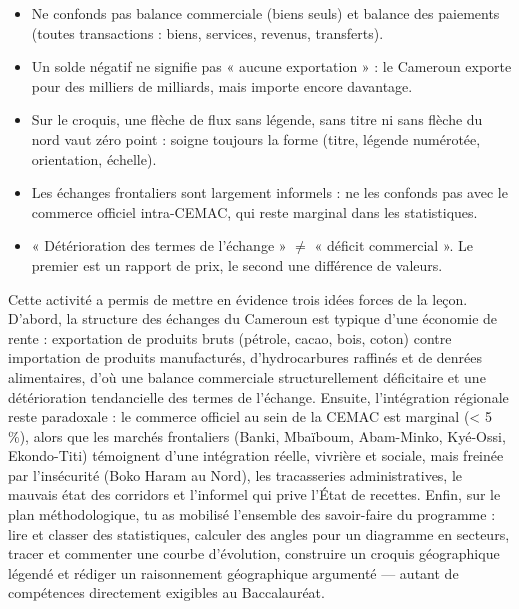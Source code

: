 \documentclass[11pt]{article}
\newcommand{\cle}[1]{{\popxbold\color{popdark}#1}}
\newcounter{popsec}
\newcounter{popsub}
\newcommand{\courssub}[1]{%
  \stepcounter{popsub}%
  \par\vspace{9pt}\noindent{\popxbold\fontsize{11.5}{13}\selectfont\color{popink}{\color{poporange}\thepopsec.\thepopsub}\hspace{6pt}#1}\par\nopagebreak\vspace{4pt}
}
\begin{document}
\begin{attention}
\begin{itemize}
\item Ne confonds pas \cle{balance commerciale} (biens seuls) et \cle{balance des paiements} (toutes transactions : biens, services, revenus, transferts).
\item Un solde négatif ne signifie pas « aucune exportation » : le Cameroun exporte pour des milliers de milliards, mais importe encore davantage.
\item Sur le croquis, une flèche de flux sans légende, sans titre ni sans flèche du nord vaut zéro point : soigne toujours la forme (titre, légende numérotée, orientation, échelle).
\item Les échanges frontaliers sont largement informels : ne les confonds pas avec le commerce officiel intra-CEMAC, qui reste marginal dans les statistiques.
\item « Détérioration des termes de l'échange » $\neq$ « déficit commercial ». Le premier est un rapport de prix, le second une différence de valeurs.
\end{itemize}
\end{attention}

\courssub{Bilan de l'activité}

Cette activité a permis de mettre en évidence trois idées forces de la leçon. D'abord, la structure des échanges du Cameroun est typique d'une économie de rente : exportation de produits bruts (pétrole, cacao, bois, coton) contre importation de produits manufacturés, d'hydrocarbures raffinés et de denrées alimentaires, d'où une balance commerciale structurellement déficitaire et une détérioration tendancielle des termes de l'échange. Ensuite, l'intégration régionale reste paradoxale : le commerce officiel au sein de la CEMAC est marginal (< 5 \%), alors que les marchés frontaliers (Banki, Mbaïboum, Abam-Minko, Kyé-Ossi, Ekondo-Titi) témoignent d'une intégration réelle, vivrière et sociale, mais freinée par l'insécurité (Boko Haram au Nord), les tracasseries administratives, le mauvais état des corridors et l'informel qui prive l'État de recettes. Enfin, sur le plan méthodologique, tu as mobilisé l'ensemble des savoir-faire du programme : lire et classer des statistiques, calculer des angles pour un diagramme en secteurs, tracer et commenter une courbe d'évolution, construire un croquis géographique légendé et rédiger un raisonnement géographique argumenté — autant de compétences directement exigibles au Baccalauréat.
\end{document}
